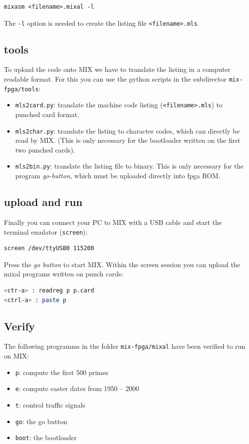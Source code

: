\documentclass[a4paper,ngerman]{scrartcl}
\begin{document}
\begin{lstlisting}[numbers=none,frame=none]
mixasm <filename>.mixal -l
\end{lstlisting}

The \lstinline|-l| option is needed to create the listing file \lstinline|<filename>.mls|.


\subsection{tools}
To upload the code onto MIX we have to translate the listing in a computer readable format. For this you can use the python scripts in the subdirector \lstinline|mix-fpga/tools|:
\begin{itemize}
	\item \lstinline|mls2card.py|: translate the machine code listing (\lstinline|<filename>.mls|) to punched card format.
	\item  \lstinline|mls2char.py|: translate the listing to character codes, which can directly be read by MIX. (This is only necessary for the bootloader written on the first two punched cards).
	\item  \lstinline|mls2bin.py|: translate the listing file to binary. This is only necessary for the program \textit{go-button}, which must be uploaded directly into fpga ROM.
	 
\end{itemize}

\subsection{upload and run}
Finally you can connect your PC to MIX with a USB cable and start the  terminal emulator (\lstinline|screen|):
\begin{lstlisting}[numbers=none,frame=none]
screen /dev/ttyUSB0 115200
\end{lstlisting}
Press the \textit{go button} to start MIX. Within  the screen session you can upload the mixal programs written on punch cards:
\begin{lstlisting}[language=bash,numbers=none,frame=none]
<ctr-a> : readreg p p.card
<ctrl-a> : paste p
\end{lstlisting}


\subsection{Verify}
The following programms in the folder \lstinline|mix-fpga/mixal| have been verified to run on MIX:
\begin{itemize}
	\item \lstinline|p|: compute the first 500 primes
	\item \lstinline|e|: compute easter dates from 1950 -- 2000
	\item  \lstinline|t|: control traffic signals
	\item  \lstinline|go|: the go button
	\item \lstinline|boot|: the bootloader
\end{itemize}
\end{document}
